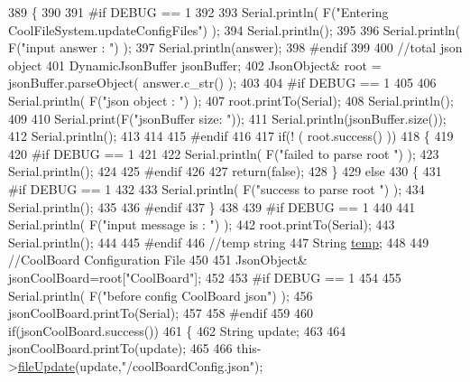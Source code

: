 \begin{DoxyCode}
389 \{
390 
391 \textcolor{preprocessor}{#if DEBUG == 1}
392 
393     Serial.println( F(\textcolor{stringliteral}{"Entering CoolFileSystem.updateConfigFiles"}) );
394     Serial.println();
395     
396     Serial.println( F(\textcolor{stringliteral}{"input answer : "}) );
397     Serial.println(answer);
398 \textcolor{preprocessor}{#endif}
399 
400     \textcolor{comment}{//total json object }
401     DynamicJsonBuffer jsonBuffer;
402     JsonObject& root = jsonBuffer.parseObject( answer.c\_str() );
403 
404 \textcolor{preprocessor}{#if DEBUG == 1}
405     
406     Serial.println( F(\textcolor{stringliteral}{"json object : "}) );  
407     root.printTo(Serial);
408     Serial.println();
409     
410     Serial.print(F(\textcolor{stringliteral}{"jsonBuffer size: "}));
411     Serial.println(jsonBuffer.size());
412     Serial.println();
413 
414 
415 \textcolor{preprocessor}{#endif}
416 
417     \textcolor{keywordflow}{if}(! ( root.success() ))
418     \{
419     
420 \textcolor{preprocessor}{    #if DEBUG == 1}
421 
422         Serial.println( F(\textcolor{stringliteral}{"failed to parse root "}) );
423         Serial.println();
424     
425 \textcolor{preprocessor}{    #endif}
426 
427         \textcolor{keywordflow}{return}(\textcolor{keyword}{false});
428     \}
429     \textcolor{keywordflow}{else}
430     \{
431 \textcolor{preprocessor}{    #if DEBUG == 1}
432         
433         Serial.println( F(\textcolor{stringliteral}{"success to parse root "}) );
434         Serial.println();
435         
436 \textcolor{preprocessor}{    #endif  }
437     \}
438     
439 \textcolor{preprocessor}{#if DEBUG == 1}
440 
441     Serial.println( F(\textcolor{stringliteral}{"input message is : "}) );
442     root.printTo(Serial);
443     Serial.println();
444 
445 \textcolor{preprocessor}{#endif}
446     \textcolor{comment}{//temp string}
447     String \hyperlink{_irene3000_8h_a5905d48604152cf57aa6bfa087b49173}{temp};
448 
449     \textcolor{comment}{//CoolBoard Configuration File}
450 
451         JsonObject& jsonCoolBoard=root[\textcolor{stringliteral}{"CoolBoard"}];
452 
453 \textcolor{preprocessor}{#if DEBUG == 1}
454 
455     Serial.println( F(\textcolor{stringliteral}{"before config CoolBoard json"}) );
456     jsonCoolBoard.printTo(Serial);
457 
458 \textcolor{preprocessor}{#endif}
459 
460     \textcolor{keywordflow}{if}(jsonCoolBoard.success())
461     \{
462         String update;
463     
464         jsonCoolBoard.printTo(update);
465 
466         this->\hyperlink{class_cool_file_system_a13f2958f5b87757c31fc53797a30d23a}{fileUpdate}(update,\textcolor{stringliteral}{"/coolBoardConfig.json"});     

\end{DoxyCode}
